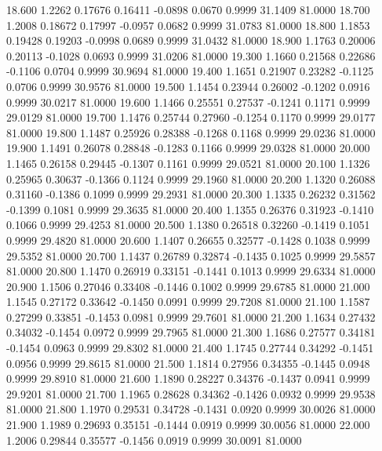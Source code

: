   18.600   1.2262   0.17676   0.16411  -0.0898   0.0670   0.9999  31.1409  81.0000
  18.700   1.2008   0.18672   0.17997  -0.0957   0.0682   0.9999  31.0783  81.0000
  18.800   1.1853   0.19428   0.19203  -0.0998   0.0689   0.9999  31.0432  81.0000
  18.900   1.1763   0.20006   0.20113  -0.1028   0.0693   0.9999  31.0206  81.0000
  19.300   1.1660   0.21568   0.22686  -0.1106   0.0704   0.9999  30.9694  81.0000
  19.400   1.1651   0.21907   0.23282  -0.1125   0.0706   0.9999  30.9576  81.0000
  19.500   1.1454   0.23944   0.26002  -0.1202   0.0916   0.9999  30.0217  81.0000
  19.600   1.1466   0.25551   0.27537  -0.1241   0.1171   0.9999  29.0129  81.0000
  19.700   1.1476   0.25744   0.27960  -0.1254   0.1170   0.9999  29.0177  81.0000
  19.800   1.1487   0.25926   0.28388  -0.1268   0.1168   0.9999  29.0236  81.0000
  19.900   1.1491   0.26078   0.28848  -0.1283   0.1166   0.9999  29.0328  81.0000
  20.000   1.1465   0.26158   0.29445  -0.1307   0.1161   0.9999  29.0521  81.0000
  20.100   1.1326   0.25965   0.30637  -0.1366   0.1124   0.9999  29.1960  81.0000
  20.200   1.1320   0.26088   0.31160  -0.1386   0.1099   0.9999  29.2931  81.0000
  20.300   1.1335   0.26232   0.31562  -0.1399   0.1081   0.9999  29.3635  81.0000
  20.400   1.1355   0.26376   0.31923  -0.1410   0.1066   0.9999  29.4253  81.0000
  20.500   1.1380   0.26518   0.32260  -0.1419   0.1051   0.9999  29.4820  81.0000
  20.600   1.1407   0.26655   0.32577  -0.1428   0.1038   0.9999  29.5352  81.0000
  20.700   1.1437   0.26789   0.32874  -0.1435   0.1025   0.9999  29.5857  81.0000
  20.800   1.1470   0.26919   0.33151  -0.1441   0.1013   0.9999  29.6334  81.0000
  20.900   1.1506   0.27046   0.33408  -0.1446   0.1002   0.9999  29.6785  81.0000
  21.000   1.1545   0.27172   0.33642  -0.1450   0.0991   0.9999  29.7208  81.0000
  21.100   1.1587   0.27299   0.33851  -0.1453   0.0981   0.9999  29.7601  81.0000
  21.200   1.1634   0.27432   0.34032  -0.1454   0.0972   0.9999  29.7965  81.0000
  21.300   1.1686   0.27577   0.34181  -0.1454   0.0963   0.9999  29.8302  81.0000
  21.400   1.1745   0.27744   0.34292  -0.1451   0.0956   0.9999  29.8615  81.0000
  21.500   1.1814   0.27956   0.34355  -0.1445   0.0948   0.9999  29.8910  81.0000
  21.600   1.1890   0.28227   0.34376  -0.1437   0.0941   0.9999  29.9201  81.0000
  21.700   1.1965   0.28628   0.34362  -0.1426   0.0932   0.9999  29.9538  81.0000
  21.800   1.1970   0.29531   0.34728  -0.1431   0.0920   0.9999  30.0026  81.0000
  21.900   1.1989   0.29693   0.35151  -0.1444   0.0919   0.9999  30.0056  81.0000
  22.000   1.2006   0.29844   0.35577  -0.1456   0.0919   0.9999  30.0091  81.0000
